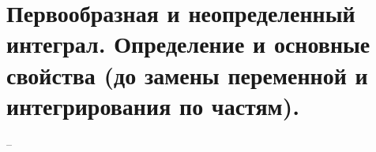 \section{Первообразная и неопределенный интеграл. Определение и основные свойства (до замены переменной и интегрирования по частям).}
--
\newline